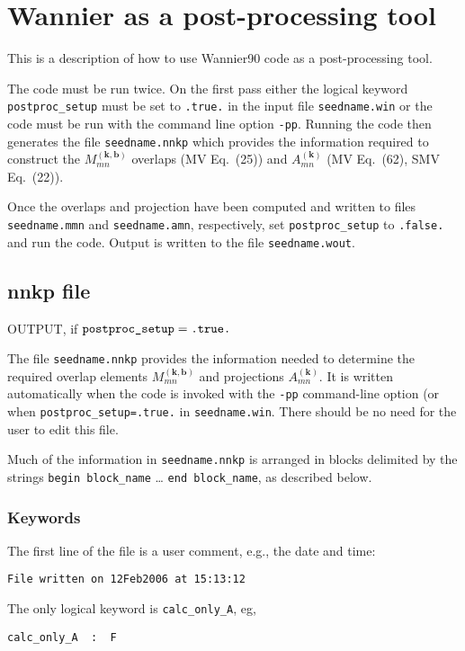 \chapter{Wannier as a post-processing tool} \label{ch:wann-pp}

This is a description of how to use Wannier90 code as a
post-processing tool. 

The code must be run twice. On the first pass either the logical keyword
\verb#postproc_setup# must be set to \verb#.true.# in the input file
\verb#seedname.win# or the code must be run with the command line
option \verb#-pp#.  Running the code then generates the file
\verb#seedname.nnkp# which provides the information required to 
construct the $M_{mn}^{(\mathbf{k,b})}$ overlaps (MV Eq.~(25)) and
$A_{mn}^{(\mathbf{k})}$ (MV Eq.~(62), SMV Eq.~(22)). 

Once the overlaps and projection have been computed and written to
files \verb#seedname.mmn# and \verb#seedname.amn#, respectively,
set \verb#postproc_setup# to \verb#.false.# and run the code. Output is
written to the file \verb#seedname.wout#.


\section{nnkp file}

OUTPUT, if $\verb#postproc_setup#=\verb#.true.#$

The file \verb#seedname.nnkp# provides the information needed to
determine the required overlap elements $M_{mn}^{(\mathbf{k,b})}$ and
projections $A_{mn}^{(\mathbf{k})}$. It is written automatically when
the code is invoked with the \verb#-pp# command-line option (or when
\verb#postproc_setup=.true.# in \verb#seedname.win#. There should be
no need for the user to edit this file.

Much of the information in \verb#seedname.nnkp# is arranged in blocks
delimited by the strings \verb#begin block_name# \ldots
\verb#end block_name#, as described below. 


\subsection{Keywords}
The first line of the file is a user comment, e.g., the date and time:

\verb#File written on 12Feb2006 at 15:13:12#

\noindent 
The only logical keyword is \verb#calc_only_A#, eg,

\verb#calc_only_A  :  F#

